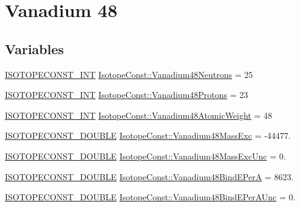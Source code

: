 \hypertarget{group___isotope_const-_vanadium-_v48}{}\section{Vanadium 48}
\label{group___isotope_const-_vanadium-_v48}
\subsection*{Variables}
\begin{DoxyCompactItemize}
\item 
\mbox{\hyperlink{group___isotope_const-_macros_ga5f18360b3e99483a35c32d789e62621c}{I\+S\+O\+T\+O\+P\+E\+C\+O\+N\+S\+T\+\_\+\+I\+NT}} \mbox{\hyperlink{group___isotope_const-_vanadium-_v48_ga820d0ee2351c72d8e9d5c85c580d3145}{Isotope\+Const\+::\+Vanadium48\+Neutrons}} = 25
\item 
\mbox{\hyperlink{group___isotope_const-_macros_ga5f18360b3e99483a35c32d789e62621c}{I\+S\+O\+T\+O\+P\+E\+C\+O\+N\+S\+T\+\_\+\+I\+NT}} \mbox{\hyperlink{group___isotope_const-_vanadium-_v48_ga1f56ffb1a5c29924818f1b53f1c60b5d}{Isotope\+Const\+::\+Vanadium48\+Protons}} = 23
\item 
\mbox{\hyperlink{group___isotope_const-_macros_ga5f18360b3e99483a35c32d789e62621c}{I\+S\+O\+T\+O\+P\+E\+C\+O\+N\+S\+T\+\_\+\+I\+NT}} \mbox{\hyperlink{group___isotope_const-_vanadium-_v48_ga996f68c61837151fe38acc37a4987633}{Isotope\+Const\+::\+Vanadium48\+Atomic\+Weight}} = 48
\item 
\mbox{\hyperlink{group___isotope_const-_macros_ga8f45a7272ce02c0b4c65c44636ed719a}{I\+S\+O\+T\+O\+P\+E\+C\+O\+N\+S\+T\+\_\+\+D\+O\+U\+B\+LE}} \mbox{\hyperlink{group___isotope_const-_vanadium-_v48_ga69c17eded9f06c1259cfb309fd2d0a89}{Isotope\+Const\+::\+Vanadium48\+Mass\+Exc}} = -\/44477.
\item 
\mbox{\hyperlink{group___isotope_const-_macros_ga8f45a7272ce02c0b4c65c44636ed719a}{I\+S\+O\+T\+O\+P\+E\+C\+O\+N\+S\+T\+\_\+\+D\+O\+U\+B\+LE}} \mbox{\hyperlink{group___isotope_const-_vanadium-_v48_ga8c98126b94087a1ee4b93d479c573f7c}{Isotope\+Const\+::\+Vanadium48\+Mass\+Exc\+Unc}} = 0.
\item 
\mbox{\hyperlink{group___isotope_const-_macros_ga8f45a7272ce02c0b4c65c44636ed719a}{I\+S\+O\+T\+O\+P\+E\+C\+O\+N\+S\+T\+\_\+\+D\+O\+U\+B\+LE}} \mbox{\hyperlink{group___isotope_const-_vanadium-_v48_gabdb4d2627bca66a2f52e61b1f43cd3ec}{Isotope\+Const\+::\+Vanadium48\+Bind\+E\+PerA}} = 8623.
\item 
\mbox{\hyperlink{group___isotope_const-_macros_ga8f45a7272ce02c0b4c65c44636ed719a}{I\+S\+O\+T\+O\+P\+E\+C\+O\+N\+S\+T\+\_\+\+D\+O\+U\+B\+LE}} \mbox{\hyperlink{group___isotope_const-_vanadium-_v48_gac3b8c7a8bf026b45ee8d9b9d9f6193b7}{Isotope\+Const\+::\+Vanadium48\+Bind\+E\+Per\+A\+Unc}} = 0.

\end{DoxyCompactItemize}

